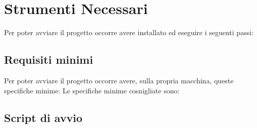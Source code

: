 \section{Strumenti Necessari}
Per poter avviare il progetto occorre avere installato ed eseguire i seguenti passi:
\subsection{Requisiti minimi}
Per poter avviare il progetto occorre avere, sulla propria macchina, queste specifiche minime:
Le specifiche minime cosnigliate sono:
\subsection{Script di avvio}

